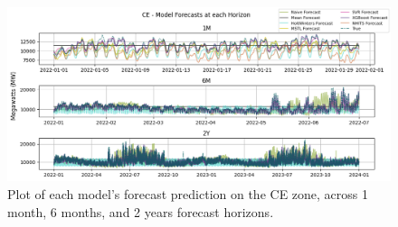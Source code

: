 \documentclass[sigconf]{acmart}
\begin{document}
    \begin{figure}[hbt!]
    \includegraphics[width=\textwidth]{Images/Result_Plot_2.png}
    \caption{Plot of each model's forecast prediction on the CE zone, across 1 month, 6 months, and 2 years forecast horizons.}
    \Description{}
    \label{fig:resultsplot1}
  \end{figure}
  
\end{document}
